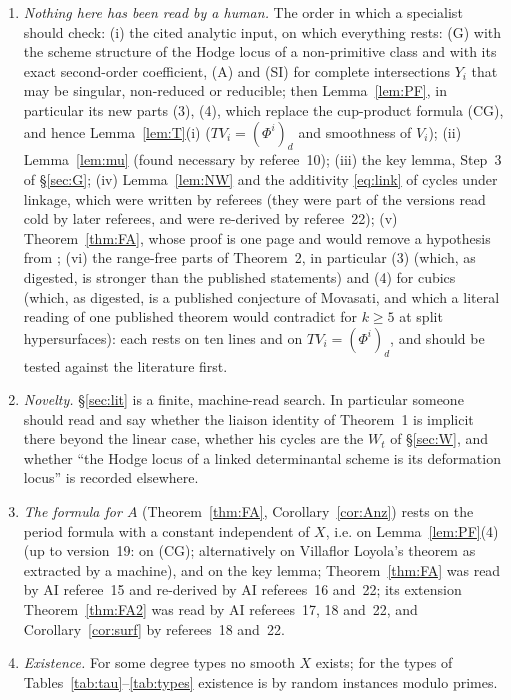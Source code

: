 \documentclass[11pt]{article}
\numberwithin{equation}{section}
\theoremstyle{remark}
\begin{document}
\begin{enumerate}
\item \emph{Nothing here has been read by a human.} The order in which a specialist should check: (i) the cited
analytic input, on which everything rests: (G) with the scheme structure of the Hodge locus of a non-primitive
class and with its exact second-order coefficient, (A) and (SI) for complete intersections $Y_i$ that may be
singular, non-reduced or reducible; then Lemma~\ref{lem:PF}, in particular its new parts (3), (4), which replace
the cup-product formula (CG),
and hence Lemma~\ref{lem:T}(i) ($TV_i=(\Phi^i)_d$ and smoothness of $V_i$); (ii) Lemma~\ref{lem:mu} (found
necessary by referee~10); (iii) the key lemma, Step~3 of \S\ref{sec:G}; (iv) Lemma~\ref{lem:NW} and the
additivity \eqref{eq:link} of cycles under linkage, which were written by referees (they were part of the
versions read cold by later referees, and were re-derived by referee~22);
(v) Theorem~\ref{thm:FA}, whose proof is one page and would remove a hypothesis from \cite{P2}; (vi) the
range-free parts of Theorem~2, in particular (3) (which, as digested, is stronger than the published
statements) and (4) for cubics (which, as digested, is a published conjecture of Movasati, and which a literal
reading of one published theorem would contradict for $k\ge5$ at split hypersurfaces): each rests on ten lines
and on $TV_i=(\Phi^i)_d$, and should be tested against the literature first.
\item \emph{Novelty.} \S\ref{sec:lit} is a finite, machine-read search. In particular someone should read
\cite[\S6]{Kl} and say whether the liaison identity of Theorem~1 is implicit there beyond the linear case,
whether his cycles are the $W_t$ of \S\ref{sec:W}, and whether ``the Hodge locus of a linked determinantal
scheme is its deformation locus'' is recorded elsewhere.
\item \emph{The formula for $A$} (Theorem~\ref{thm:FA}, Corollary~\ref{cor:Anz}) rests on the period formula with a
constant independent of $X$, i.e. on Lemma~\ref{lem:PF}(4) (up to version~19: on (CG); alternatively on Villaflor
Loyola's theorem as extracted by a machine), and on the key lemma; Theorem~\ref{thm:FA} was read by AI referee~15 and re-derived by AI referees~16 and~22; its extension
Theorem~\ref{thm:FA2} was read by AI referees~17, 18 and~22, and Corollary~\ref{cor:surf} by referees~18 and~22.
\item \emph{Existence.} For some degree types no smooth $X$ exists; for the types of
Tables~\ref{tab:tau}--\ref{tab:types} existence is by random instances modulo primes.

\end{enumerate}
\end{document}
